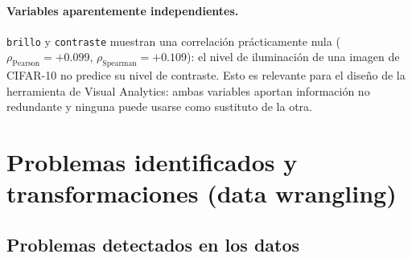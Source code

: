 \documentclass[11pt,a4paper]{article}
\begin{document}
\paragraph{Variables aparentemente independientes.} \texttt{brillo} y
\texttt{contraste} muestran una correlación prácticamente nula
($\rho_{\text{Pearson}}=+0.099$, $\rho_{\text{Spearman}}=+0.109$): el nivel de
iluminación de una imagen de CIFAR-10 no predice su nivel de contraste. Esto es
relevante para el diseño de la herramienta de Visual Analytics: ambas variables
aportan información no redundante y ninguna puede usarse como sustituto de la
otra.

\section{Problemas identificados y transformaciones (data wrangling)}

\subsection{Problemas detectados en los datos}
\end{document}
